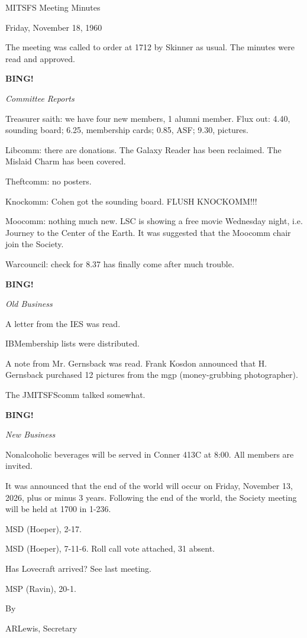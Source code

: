 \documentclass[12pt]{article}
\newcommand{\bing}{{\bf BING!} }
\newcommand{\goto}[1]{\bing \vskip 12pt \centerline{{\em{#1}}}}
\begin{document}
\begin{center}

MITSFS Meeting Minutes

Friday, November 18, 1960

\end{center}
 
\vspace{12pt}

\setlength{\parskip}{6pt}

\noindent
The meeting was called to order at 1712 by Skinner as usual. The minutes were read and approved.

\goto{Committee Reports}

Treasurer saith: we have four new members, 1 alumni member. Flux out: 4.40, sounding board; 6.25, membership cards; 0.85, ASF; 9.30, pictures.

Libcomm: there are donations. The Galaxy Reader has been reclaimed. The Mislaid Charm has been covered.

Theftcomm: no posters.

Knockomm: Cohen got the sounding board. FLUSH KNOCKOMM!!!

Moocomm: nothing much new. LSC is showing a free movie Wednesday night, i.e. Journey to the Center of the Earth. It was suggested that the Moocomm chair join the Society.

Warcouncil: check for 8.37 has finally come after much trouble.

\goto{Old Business}

A letter from the IES was read.

IBMembership lists were distributed.

A note from Mr. Gernsback was read. Frank Kosdon announced that H. Gernsback purchased 12 pictures from the mgp (money-grubbing photographer).

The JMITSFScomm talked somewhat.

\goto{New Business}

Nonalcoholic beverages will be served in Conner 413C at 8:00. All members are invited.

It was announced that the end of the world will occur on Friday, November 13, 2026, plus or minus 3 years. Following the end of the world, the Society meeting will be held at 1700 in 1-236.

MSD (Hoeper), 2-17.

MSD (Hoeper), 7-11-6. Roll call vote attached, 31 absent.

Has Lovecraft arrived? See last meeting.

MSP (Ravin), 20-1.

\vspace{12pt}

\centerline{By}
\centerline{ARLewis, Secretary}
\end{document}
